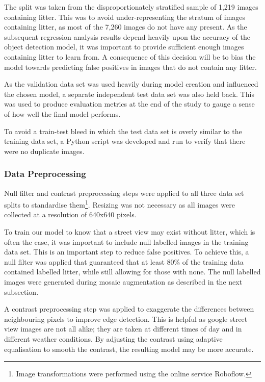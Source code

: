\documentclass{thesis}
\begin{document}
The split was taken from the disproportionately stratified sample of 1,219 images containing litter. This was to avoid under-representing the stratum of images containing litter, as most of the 7,260 images do not have any present. As the subsequent regression analysis results depend heavily upon the accuracy of the object detection model, it was important to provide sufficient enough images containing litter to learn from. A consequence of this decision will be to bias the model towards predicting false positives in images that do not contain any litter.

As the validation data set was used heavily during model creation and influenced the chosen model, a separate independent test data set was also held back. This was used to produce evaluation metrics at the end of the study to gauge a sense of how well the final model performs.

To avoid a train-test bleed in which the test data set is overly similar to the training data set, a Python script was developed and run to verify that there were no duplicate images.

\subsubsection{Data Preprocessing}

Null filter and contrast preprocessing steps were applied to all three data set splits to standardise them\footnote{Image transformations were performed using the online service Roboflow.}. Resizing was not necessary as all images were collected at a resolution of 640x640 pixels. 

To train our model to know that a street view may exist without litter, which is often the case, it was important to include null labelled images in the training data set. This is an important step to reduce false positives. To achieve this, a null filter was applied that guaranteed that at least 80\% of the training data contained labelled litter, while still allowing for those with none. The null labelled images were generated during mosaic augmentation as described in the next subsection.

A contrast preprocessing step was applied to exaggerate the differences between neighbouring pixels to improve edge detection\cite{roboflow-contrast}. This is helpful as google street view images are not all alike; they are taken at different times of day and in different weather conditions. By adjusting the contrast using adaptive equalisation to smooth the contrast, the resulting model may be more accurate.
\end{document}
